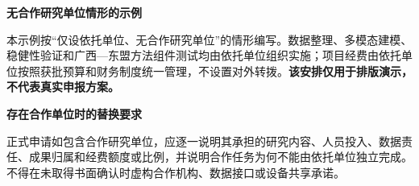 \GXNSFBodyText

\noindent\textbf{无合作研究单位情形的示例}\par
本示例按“仅设依托单位、无合作研究单位”的情形编写。数据整理、多模态建模、稳健性验证和广西—东盟方法组件测试均由依托单位组织实施；项目经费由依托单位按照获批预算和财务制度统一管理，不设置对外转拨。\textbf{该安排仅用于排版演示，不代表真实申报方案。}

\noindent\textbf{存在合作单位时的替换要求}\par
正式申请如包含合作研究单位，应逐一说明其承担的研究内容、人员投入、数据责任、成果归属和经费额度或比例，并说明合作任务为何不能由依托单位独立完成。不得在未取得书面确认时虚构合作机构、数据接口或设备共享承诺。

